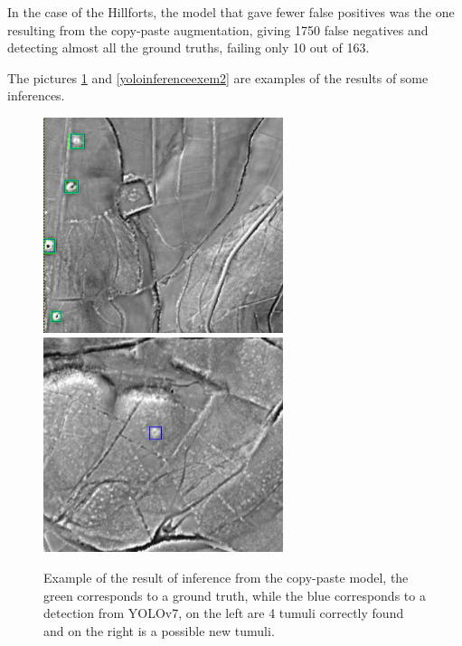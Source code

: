 In the case of the Hillforts, the model that gave fewer false positives was the one resulting from the copy-paste augmentation, giving 1750 false negatives and detecting almost all the ground truths, failing only 10 out of 163.


The pictures \ref{yoloinferenceexem1} and \ref{yoloinferenceexem2} are examples of the results of some inferences.

\begin{figure}[H]
    \centering
    {{\includegraphics[width=7cm]{images/examples_inference/yolov7/mamoas/correct.png} }}
    \qquad
  {{\includegraphics[width=7cm]{images/examples_inference/yolov7/mamoas/possibleFound.png} }}
    \caption{Example of the result of inference from the copy-paste model, the green corresponds to a ground truth, while the blue corresponds to a detection from YOLOv7, on the left are 4 tumuli correctly found and on the right is a possible new tumuli.}
    \label{yoloinferenceexem1}
\end{figure}

